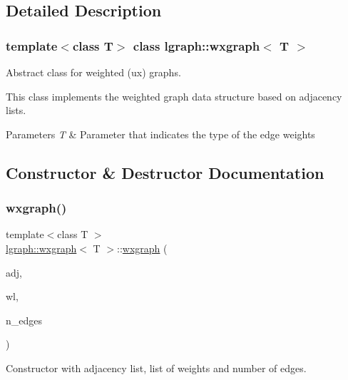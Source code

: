 \subsection{Detailed Description}
\subsubsection*{template$<$class T$>$\newline
class lgraph\+::wxgraph$<$ T $>$}

Abstract class for weighted (ux) graphs. 

This class implements the weighted graph data structure based on adjacency lists.


\begin{DoxyParams}{Parameters}
{\em T} & Parameter that indicates the type of the edge weights \\
\hline
\end{DoxyParams}


\subsection{Constructor \& Destructor Documentation}
\mbox{\label{classlgraph_1_1wxgraph_a6b99dfb7f13c6a8f223b74fecd0ea4a5}} 
\subsubsection{\texorpdfstring{wxgraph()}{wxgraph()}}
{\footnotesize\ttfamily template$<$class T $>$ \\
\hyperlink{classlgraph_1_1wxgraph}{lgraph\+::wxgraph}$<$ T $>$\+::\hyperlink{classlgraph_1_1wxgraph}{wxgraph} (\begin{DoxyParamCaption}\item[{const std\+::vector$<$ \hyperlink{namespacelgraph_a052e7766c13f3a43cec0aec8173fdede}{neighbourhood} $>$ \&}]{adj,  }\item[{const std\+::vector$<$ \hyperlink{namespacelgraph_a1e0fd5ef0a78b2a92da48adbed265cb6}{weight\+\_\+list}$<$ T $>$ $>$ \&}]{wl,  }\item[{size\+\_\+t}]{n\+\_\+edges }\end{DoxyParamCaption})}



Constructor with adjacency list, list of weights and number of edges. 


